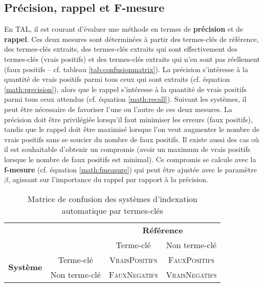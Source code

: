     \subsection{Précision, rappel et F-mesure}
    \label{subsec:main-state_of_the_art-automatic_evaluation_of_keyphrase_annotation-evaluation-precision_recall_and_f_measure}
      En TAL, il est courant d'évaluer une méthode en termes de
      \textbf{précision} et de \textbf{rappel}. Ces deux mesures sont
      déterminées à partir des termes-clés de référence, des termes-clés
      extraits, des termes-clés extraits qui sont effectivement des
      termes-clés (vrais positifs) et des termes-clés extraits qui n'en sont
      pas réellement (faux positifs -- cf. tableau \ref{tab:confusionmatrix}).
      La précision s'intéresse à la quantité de vrais positifs parmi tous ceux
      qui sont extraits (cf. équation \ref{math:precision}), alors que le
      rappel s'intéresse à la quantité de vrais positifs parmi tous ceux
      attendus (cf. équation \ref{math:recall}). Suivant les systèmes, il peut
      être nécessaire de favoriser l'une ou l'autre de ces deux mesures. La
      précision doit être privilégiée lorsqu'il faut minimiser les erreurs
      (faux positifs), tandis que le rappel doit être maximisé lorsque l'on
      veut augmenter le nombre de vrais positifs sans se soucier du nombre de
      faux positifs. Il existe aussi des cas où il est souhaitable d'obtenir
      un compromis (avoir un maximum de vrais positifs lorsque le nombre de
      faux positifs est minimal). Ce compromis se calcule avec la
      \textbf{f-mesure} (cf. équation \ref{math:fmeasure}) qui peut être
      ajustée avec le paramètre $\beta$, agissant sur l'importance du rappel
      par rapport à la précision.
      \begin{table}
        \begin{center}
          \begin{tabular}{|c|c|c|c|}
            \cline{3-4}
            \multicolumn{2}{c|}{} & \multicolumn{2}{|c|}{\textbf{Référence}}\\
            \cline{3-4}
            \multicolumn{2}{c|}{} & Terme-clé & Non terme-clé\\
            \hline
            \multirow{2}{*}{\textbf{Système}} & Terme-clé & \textsc{VraisPositifs} & \textsc{FauxPositifs}\\
            \cline{2-4}
            & Non terme-clé & \textsc{FauxNegatifs} & \textsc{VraisNegatifs}\\
            \hline
          \end{tabular}
          \caption{Matrice de confusion des systèmes d'indexation automatique
                   par termes-clés
                  \label{tab:confusion_matrix}}
        \end{center}
      \end{table}
